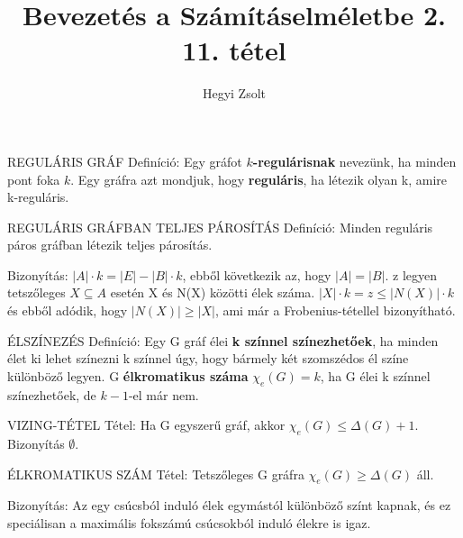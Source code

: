 \documentclass[]{article}
\title{Bevezetés a Számításelméletbe 2.\\{\large 11. tétel}}
\author{Hegyi Zsolt}
\begin{document}
\maketitle
\begin{shaded}
REGULÁRIS GRÁF Definíció: Egy gráfot \textbf{$k$-regulárisnak} nevezünk, ha minden pont foka $k$. Egy gráfra azt mondjuk, hogy \textbf{reguláris}, ha létezik olyan k, amire k-reguláris.
\end{shaded}
\begin{framed}
REGULÁRIS GRÁFBAN TELJES PÁROSÍTÁS Definíció: Minden reguláris páros gráfban létezik teljes párosítás.
\end{framed}
\begin{leftbar}
Bizonyítás:
$|A|\cdot k = |E| - |B|\cdot k$, ebből következik az, hogy $|A| = |B|$. z legyen tetszőleges $X \subseteq A$ esetén X és N(X) közötti élek száma.
$|X|\cdot k = z \leq |N(X)|\cdot k$ és ebből adódik, hogy $|N(X)| \geq |X|$, ami már a Frobenius-tétellel bizonyítható.
\end{leftbar}
\begin{shaded}
ÉLSZÍNEZÉS Definíció: Egy G gráf élei \textbf{k színnel színezhetőek}, ha minden élet ki lehet színezni k színnel úgy, hogy bármely két szomszédos él színe különböző legyen. G \textbf{élkromatikus száma} $\chi_e(G) = k$, ha G élei k színnel színezhetőek, de $k - 1$-el már nem.
\end{shaded}
\begin{framed}
VIZING-TÉTEL Tétel: Ha G egyszerű gráf, akkor $\chi_e(G) \leq \Delta(G) + 1$. Bizonyítás $\emptyset$.
\end{framed}
\begin{framed}
ÉLKROMATIKUS SZÁM Tétel: Tetszőleges G gráfra $\chi_e(G) \geq \Delta(G)$ áll.
\end{framed}
\begin{leftbar}
Bizonyítás: Az egy csúcsból induló élek egymástól különböző színt kapnak, és ez speciálisan a maximális fokszámú csúcsokból induló élekre is igaz.
\end{leftbar}
\end{document}
